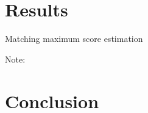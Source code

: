 \documentclass[10pt]{article}
\begin{document}
\section{Results}

\begin{table}[!htbp]
  \begin{center}\footnotesize
      \caption{Matching maximum score estimation}
      \label{tb:maximum_score_estimate} 
      
  \end{center}\footnotesize
  Note: 
\end{table} 


\section{Conclusion}



\end{document}
